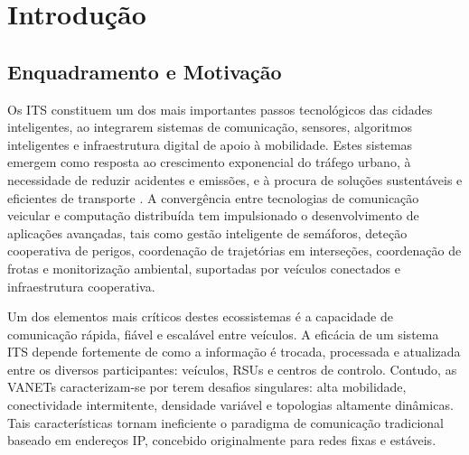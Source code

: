 
%


\chapter{Introdução}
\label{cha:introducao}

\section{Enquadramento e Motivação}
\label{sec:enquadramento_motivacao}

Os \gls{ITS} constituem um dos mais importantes passos tecnológicos das cidades inteligentes, ao integrarem sistemas de comunicação, sensores, algoritmos inteligentes e infraestrutura digital de apoio à mobilidade. Estes sistemas emergem como resposta ao crescimento exponencial do tráfego urbano, à necessidade de reduzir acidentes e emissões, e à procura de soluções sustentáveis e eficientes de transporte \cite{zeadally_vehicular_2020}. A convergência entre tecnologias de comunicação veicular e computação distribuída tem impulsionado o desenvolvimento de aplicações avançadas, tais como gestão inteligente de semáforos, deteção cooperativa de perigos, coordenação de trajetórias em interseções, coordenação de frotas e monitorização ambiental, suportadas por veículos conectados e infraestrutura cooperativa.  

Um dos elementos mais críticos destes ecossistemas é a capacidade de comunicação rápida, fiável e escalável entre veículos. A eficácia de um sistema \gls{ITS} depende fortemente de como a informação é trocada, processada e atualizada entre os diversos participantes: veículos, \gls{RSUs} e centros de controlo. Contudo, as \gls{VANETs} caracterizam-se por terem desafios singulares: alta mobilidade, conectividade intermitente, densidade variável e topologias altamente dinâmicas. Tais características tornam ineficiente o paradigma de comunicação tradicional baseado em endereços IP, concebido originalmente para redes fixas e estáveis.  

